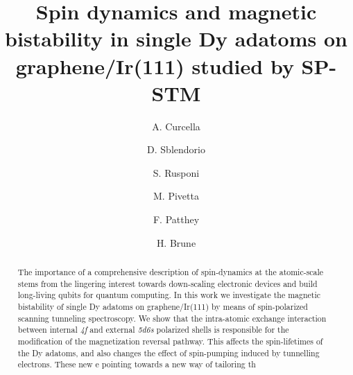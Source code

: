 \documentclass[
reprint,amsmath,amssymb,aps]{revtex4-2}
\begin{document}

\title{Spin dynamics and magnetic bistability in single Dy adatoms on graphene/Ir(111)
studied by SP-STM}

\author{A. Curcella}

\author{D. Sblendorio}

\author{S. Rusponi}

\author{M. Pivetta}

\author{F. Patthey}

\author{H. Brune}
 

\begin{abstract}

The importance of a comprehensive description of spin-dynamics at the atomic-scale stems from the lingering interest towards down-scaling electronic devices and build long-living qubits for quantum computing. In this work we investigate the magnetic bistability of single Dy adatoms on graphene/Ir(111) by means of spin-polarized scanning tunneling spectroscopy. We show that the intra-atomic exchange interaction between internal \textit{4f} and external \textit{5d6s} polarized shells is responsible for the modification of the magnetization reversal pathway. This affects the spin-lifetimes of the Dy adatoms, and also changes the effect of spin-pumping induced by tunnelling electrons. These new e pointing towards a new way of tailoring th
\end{abstract}
\end{document}
